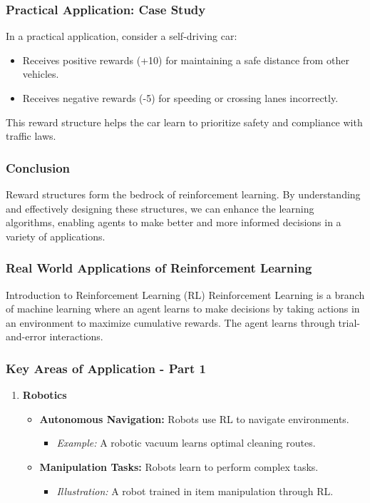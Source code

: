\documentclass[aspectratio=169]{beamer}
\begin{document}
\begin{frame}[fragile]
    \frametitle{Practical Application: Case Study}

    In a practical application, consider a self-driving car:
    
    \begin{itemize}
        \item Receives positive rewards (+10) for maintaining a safe distance from other vehicles.
        \item Receives negative rewards (-5) for speeding or crossing lanes incorrectly.
    \end{itemize}

    This reward structure helps the car learn to prioritize safety and compliance with traffic laws.
\end{frame}

\begin{frame}[fragile]
    \frametitle{Conclusion}

    Reward structures form the bedrock of reinforcement learning. By understanding and effectively designing these structures, we can enhance the learning algorithms, enabling agents to make better and more informed decisions in a variety of applications.
\end{frame}

\begin{frame}[fragile]
    \frametitle{Real World Applications of Reinforcement Learning}
    \begin{block}{Introduction to Reinforcement Learning (RL)}
        Reinforcement Learning is a branch of machine learning where an agent learns to make decisions by taking actions in an environment to maximize cumulative rewards. The agent learns through trial-and-error interactions.
    \end{block}
\end{frame}

\begin{frame}[fragile]
    \frametitle{Key Areas of Application - Part 1}
    \begin{enumerate}
        \item \textbf{Robotics}
            \begin{itemize}
                \item \textbf{Autonomous Navigation:} Robots use RL to navigate environments. 
                \begin{itemize}
                    \item \textit{Example:} A robotic vacuum learns optimal cleaning routes.
                \end{itemize}
                \item \textbf{Manipulation Tasks:} Robots learn to perform complex tasks.
                \begin{itemize}
                    \item \textit{Illustration:} A robot trained in item manipulation through RL.
                \end{itemize}
            \end{itemize}
    \end{enumerate}
\end{frame}
\end{document}
